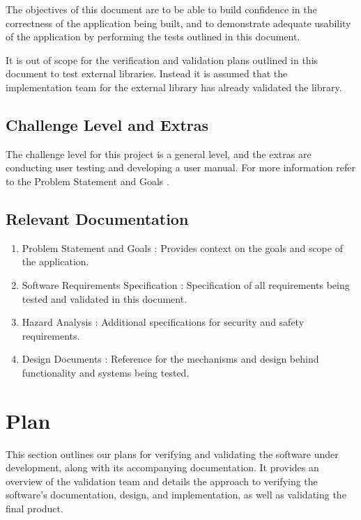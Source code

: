 \documentclass[12pt, titlepage]{article}
\begin{document}
The objectives of this document are to be able to build confidence in
the correctness of the application being built, and to demonstrate
adequate usability of the application by performing the tests
outlined in this document.

It is out of scope for the verification and validation plans outlined
in this document to test external libraries. Instead it is assumed
that the implementation team for the external library has already
validated the library.

\subsection{Challenge Level and Extras}

The challenge level for this project is a general level, and the
extras are conducting user testing and developing a user manual. For
more information refer to the Problem Statement and Goals
\citep[\textit{Challenge Level and Extras}]{ProblemStatement}.

\subsection{Relevant Documentation}

\begin{enumerate}
  \item Problem Statement and Goals \citep{ProblemStatement}:
    Provides context on the goals and scope of the application.
  \item Software Requirements Specification :
    Specification of all requirements being tested and validated in
    this document.
  \item Hazard Analysis : Additional
    specifications for security and safety requirements.
  \item Design Documents : Reference for the
    mechanisms and design behind functionality and systems being tested.
\end{enumerate}

\newpage
\section{Plan}

This section outlines our plans for verifying and validating the
software under development, along with its accompanying
documentation. It provides an overview of the validation team and
details the approach to verifying the software's documentation,
design, and implementation, as well as validating the final product.
\end{document}
